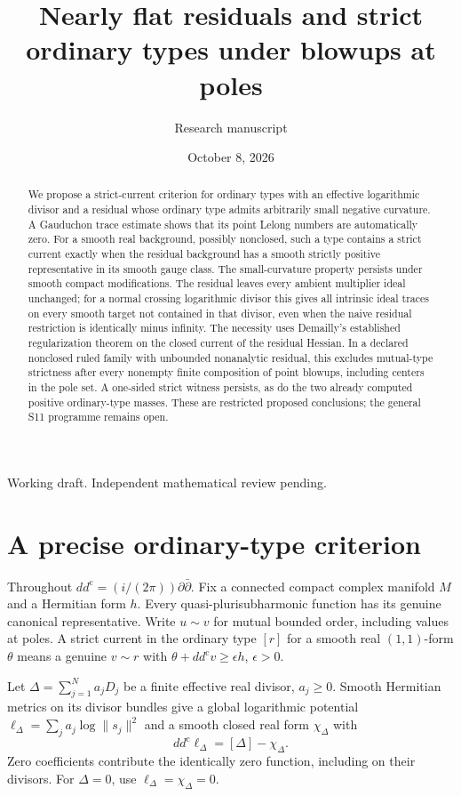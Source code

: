 \documentclass[11pt]{article}
\title{Nearly flat residuals and strict ordinary types\newline
under blowups at poles}
\author{Research manuscript}
\date{October 8, 2026}
\theoremstyle{remark}
\newcommand{\ddc}{dd^{\mathrm c}}
\begin{document}
\maketitle
\begin{center}
\small Working draft. Independent mathematical review pending.
\end{center}
\begin{abstract}
We propose a strict-current criterion for ordinary types with an effective
logarithmic divisor and a residual whose ordinary type admits arbitrarily
small negative curvature. A Gauduchon trace estimate shows that its point
Lelong numbers are automatically zero. For a smooth real background, possibly nonclosed,
such a type contains a strict current exactly when the residual background
has a smooth strictly positive representative in its smooth gauge class.
The small-curvature property persists under smooth compact modifications.
The residual leaves every ambient multiplier ideal unchanged; for a normal
crossing logarithmic divisor this gives all intrinsic ideal traces on
every smooth target not contained in that divisor, even when the naive
residual restriction is identically minus infinity.
The necessity uses Demailly's established regularization theorem on the
closed current of the residual Hessian. In a declared nonclosed ruled
family with unbounded nonanalytic residual, this excludes mutual-type
strictness after every nonempty finite composition of point blowups,
including centers in the pole set. A one-sided strict witness persists,
as do the two already computed positive ordinary-type masses. These are
restricted proposed conclusions; the general S11 programme remains open.
\end{abstract}

\section{A precise ordinary-type criterion}
Throughout $\ddc=(i/(2\pi))\partial\bar\partial$. Fix a connected compact
complex manifold $M$ and a Hermitian form $h$. Every quasi-plurisubharmonic
function has its genuine canonical representative. Write $u\sim v$ for
mutual bounded order, including values at poles. A strict current in the
ordinary type $[r]$ for a smooth real $(1,1)$-form $\theta$ means a genuine
$v\sim r$ with $\theta+\ddc v\geq\epsilon h$, $\epsilon>0$.

Let $\Delta=\sum_{j=1}^N a_jD_j$ be a finite effective real divisor,
$a_j\geq0$. Smooth Hermitian metrics on its divisor bundles give a global
logarithmic potential $\ell_\Delta=\sum_j a_j\log\|s_j\|^2$ and a smooth
closed real form $\chi_\Delta$ with
\[
 \ddc\ell_\Delta=[\Delta]-\chi_\Delta.
\]
Zero coefficients contribute the identically zero function, including
on their divisors. For $\Delta=0$, use $\ell_\Delta=\chi_\Delta=0$.
\end{document}
